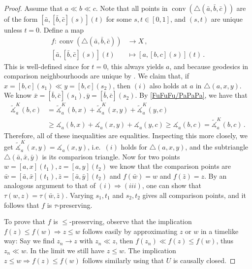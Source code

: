 \documentclass[11pt,reqno]{amsart}
\theoremstyle{definition}
\newcommand{\Cref}[1]{\zcref[S]{#1}}
\theoremstyle{definition}
\theoremstyle{plain}
\theoremstyle{remark}
\newcommand{\ma}{\measuredangle}
\DeclareMathOperator{\conv}{conv}
\begin{document}
\begin{proof}
 Assume that $a\ll b\ll c$. Note that all points in $\conv(\triangle(\bar a,\bar b,\bar c))$ are of the form $[\bar a,[\bar b,\bar c](s)](t)$ for some $s,t\in[0,1]$, and $(s,t)$ are unique unless $t=0$. Define a map 
\begin{align*}
f\colon \conv(\triangle(\bar a,\bar b,\bar c)) &\longrightarrow X \, ,\\
[\bar a,[\bar b,\bar c](s)](t) & \longmapsto [a,[ b, c](s)](t) \, .
\end{align*}
This is well-defined since for $t=0$, this always yields $a$, and because geodesics in comparison neighbourhoods are unique by \cite[Theorem 4.7]{BNR25}.
We claim that, if $x=[b,c](s_1)\ll y=[b,c](s_2)$, then $(i)$ also holds at $a$ in $\triangle(a,x,y)$.
We know $\bar x=[\bar b,\bar c](s_1),\bar y=[\bar b,\bar c](s_2)$.
By \Cref{pop:triangle inequality angles} \ref{FuFuFu/PaPaPa}, we have that
\begin{align*}
\widetilde\ma^K_a(b,c)&=\widetilde\ma^K_a(b,x)+\widetilde\ma^K_a(x,y)+\widetilde\ma^K_a(y,c)\\
&\geq \ma_a(b,x)+\ma_a(x,y)+\ma_a(y,c)\geq \ma_a(b,c)=\widetilde\ma^K_a(b,c) \, .
\end{align*}
Therefore, all of these inequalities are equalities. 
Inspecting this more closely, we get $\widetilde\ma^K_a(x,y)=\ma_a(x,y)$, i.e.\ $(i)$ holds for $\triangle(a,x,y)$, and the subtriangle $\triangle(\bar a,\bar x,\bar y)$ is its comparison triangle.
Now for two points $w=[a,x](t_1),z=[a,y](t_2)$ we know that the comparison points are $\bar w=[\bar a,\bar x](t_1),\bar z=[\bar a,\bar y](t_2)$ and $f(\bar w)=w$ and $f(\bar z)=z$. 
By an analogous argument to that of $(i) \Rightarrow (iii)$, one can show that $\tau(w,z)=\tau(\bar w,\bar z)$. Varying $s_1,t_1$ and $s_2,t_2$ gives all comparison points, and it follows that $f$ is $\tau$-preserving.

To prove that $f$ is $\leq$-preserving, observe that the implication $f(z)\leq f(w)\Rightarrow z\leq w$ follows easily by approximating $z$ or $w$ in a timelike way: Say we find $z_n \to z$ with $z_n \ll z$, then $f(z_n)\ll f(z)\leq f(w)$, thus $z_n\ll w$. In the limit we still have $z\leq w$. 
The implication $z\leq w\Rightarrow f(z)\leq f(w)$ follows similarly using that $U$ is causally closed.
\end{proof}
\end{document}
